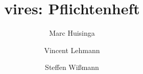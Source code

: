 \documentclass[a4paper,titlepage]{article}
\begin{document}
\author{Marc Huisinga \and Vincent Lehmann \and Steffen Wißmann}
\title{vires: Pflichtenheft}

\maketitle
\tableofcontents

\begin{abstract}

\end{abstract}














\end{document}
